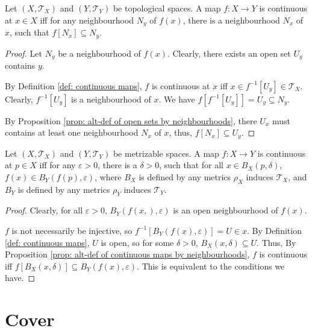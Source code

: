 \begin{proposition}
	\label{prop: alt-def of continuous maps by neighbourhoods}
	Let $(X, \mathcal T_X)$ and $(Y, \mathcal T_Y)$ be topological spaces. A map $f: X \to Y$ is continuous at $x \in X$ iff for any neighbourhood $N_y$ of $f(x)$, there is a neighbourhood $N_x$ of $x$, such that $f[N_x] \subseteq N_y$.
	
	\begin{proof}
		Let $N_y$ be a neighbourhood of $f(x)$. Clearly, there exists an open set $U_y$ contains $y$.
	
		By Definition \ref{def: continuous maps}, $f$ is continuous at $x$ iff $x \in f^{-1}[U_y] \in \mathcal T_X$. Clearly, $f^{-1}[U_y]$ is a neighbourhood of $x$. We have $f[f^{-1}[U_y]] = U_y \subseteq N_y$.
		
		By Proposition \ref{prop: alt-def of open sets by neighbourhoods}, there $U_x$ must contains at least one neighbourhood $N_x$ of $x$, thus, $f[N_x] \subseteq U_y$.
	\end{proof}
\end{proposition}


\begin{proposition}
	Let $(X, \mathcal T_X)$ and $(Y, \mathcal T_{Y})$ be metrizable spaces. A map $f: X \to Y$ is continuous at $p \in X$ iff for any $\varepsilon > 0$, there is a $\delta > 0$, such that for all $x \in B_X(p, \delta)$, $f(x) \in B_Y(f(p), \varepsilon)$, where $B_X$ is defined by any metrics $\rho_X$ induces $\mathcal T_X$, and $B_Y$ is defined by any metrics $\rho_Y$ induces $\mathcal T_Y$.
	
	\begin{proof}
		Clearly, for all $\varepsilon > 0$, $B_Y(f(x,), \varepsilon)$ is an open neighbourhood of $f(x)$.
		
		$f$ is not necessarily be injective, so $f^{-1}[B_Y(f(x), \varepsilon)] = U \in x$. By Definition \ref{def: continuous maps}, $U$ is open, so for some $\delta > 0$, $B_X(x, \delta) \subseteq U$. Thus, By Proposition \ref{prop: alt-def of continuous maps by neighbourhoods}, $f$ is continuous iff $f[B_X(x, \delta)] \subseteq B_Y(f(x), \varepsilon)$. This is equivalent to the conditions we have.
	\end{proof}
\end{proposition}


\section{Cover}


